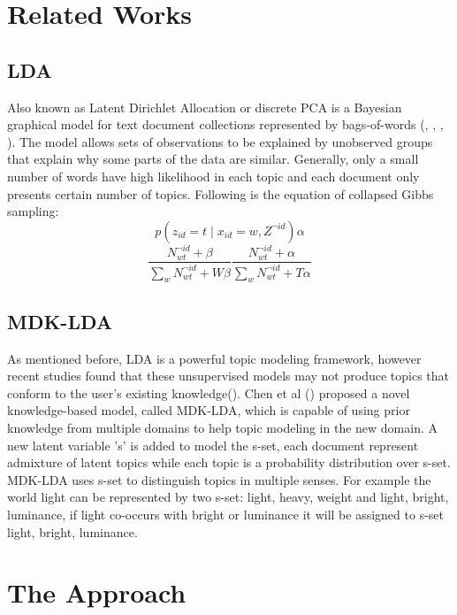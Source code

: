 \documentclass[11pt,twoside]{report}
\begin{document}
\chapter{Related Works}

\section{LDA}
Also known as Latent Dirichlet Allocation or discrete PCA is a Bayesian graphical model for text document collections represented by bags-of-words (\cite{ref26}, \cite{ref25}, \cite{ref30}, \cite{ref31}). The model allows sets of observations to be explained by unobserved groups that explain why some parts of the data are similar. Generally, only a small number of words have high likelihood in each topic and each document only presents certain number of topics. Following is the equation of collapsed Gibbs sampling:
\begin{equation}
p(z_{id}=t\mid x_{id}=w,Z^{\neg id}) \alpha
\end{equation}
\begin{equation}
\frac{N_{wt}^{\neg id} + \beta}{\sum_{w}N_{wt}^{\neg id} + W\beta} \frac{N_{wt}^{\neg id} + \alpha}{\sum_{w}N_{wt}^{\neg id} + T\alpha}
\end{equation}
\section{MDK-LDA}
As mentioned before, LDA is a powerful topic modeling framework, however recent studies found that these unsupervised models may not produce topics that conform to the user's existing knowledge(\cite{ref24}). Chen et al (\cite{ref24}) proposed a novel knowledge-based model, called MDK-LDA, which is capable of using prior knowledge from multiple domains to help topic modeling in the new domain. A new latent variable 's' is added to model the s-set, each document represent admixture of latent topics while each topic is a probability distribution over s-set. MDK-LDA uses s-set to distinguish topics in multiple senses. For example the world light can be represented by two s-set: {light, heavy, weight} and {light, bright, luminance}, if light co-occurs with bright or luminance it will be assigned to s-set {light, bright, luminance}.

\chapter{The Approach}
\end{document}
